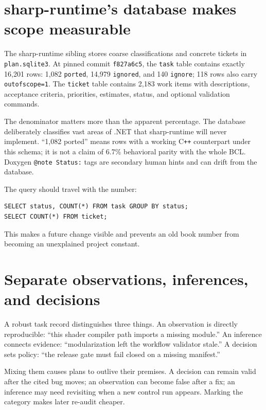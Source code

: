 \section{sharp-runtime's database makes scope measurable}

The sharp-runtime sibling stores coarse classifications and concrete tickets in
\texttt{plan.sqlite3}.  At pinned commit \texttt{f827a6c5}, the \texttt{task} table contains exactly
16,201 rows: 1,082 \texttt{ported}, 14,979 \texttt{ignored}, and 140 \texttt{ignore}; 118 rows also
carry \texttt{outofscope=1}.  The \texttt{ticket} table contains 2,183 work items with descriptions,
acceptance criteria, priorities, estimates, status, and optional validation commands.

The denominator matters more than the apparent percentage.  The database deliberately classifies
vast areas of .NET that sharp-runtime will never implement.  ``1,082 ported'' means rows with a
working C\texttt{++} counterpart under this schema; it is not a claim of 6.7\% behavioral parity
with the whole BCL.  Doxygen \texttt{@note Status:} tags are secondary human hints and can drift
from the database.

The query should travel with the number:

\begin{verbatim}
SELECT status, COUNT(*) FROM task GROUP BY status;
SELECT COUNT(*) FROM ticket;
\end{verbatim}

This makes a future change visible and prevents an old book number from becoming an unexplained
project constant.

\section{Separate observations, inferences, and decisions}

A robust task record distinguishes three things.  An observation is directly reproducible:
``this shader compiler path imports a missing module.''  An inference connects evidence:
``modularization left the workflow validator stale.''  A decision sets policy:
``the release gate must fail closed on a missing manifest.''

Mixing them causes plans to outlive their premises.  A decision can remain valid after the cited
bug moves; an observation can become false after a fix; an inference may need revisiting when a
new control run appears.  Marking the category makes later re-audit cheaper.

